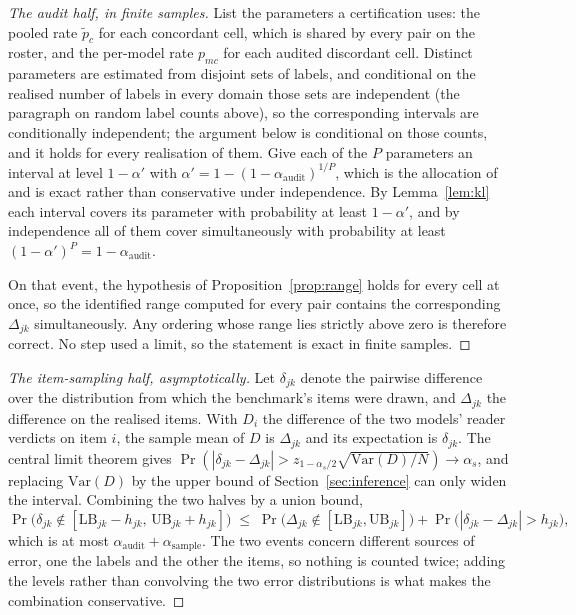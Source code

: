 \begin{proof}[The audit half, in finite samples]
List the parameters a certification uses: the pooled rate $\tilde p_c$ for each concordant
cell, which is shared by every pair on the roster, and the per-model rate $p_{mc}$ for each
audited discordant cell. Distinct parameters are estimated from disjoint sets of labels, and
conditional on the realised number of labels in every domain those sets are independent (the
paragraph on random label counts above), so the corresponding intervals are conditionally
independent; the argument below is conditional on those counts, and it holds for every
realisation of them. Give each of the $P$ parameters an interval at level
$1 - \alpha'$ with $\alpha' = 1 - (1 - \alpha_{\mathrm{audit}})^{1/P}$, which is the
allocation of \citet{sidak1967rectangular} and is exact rather than conservative under
independence. By Lemma~\ref{lem:kl} each interval covers its parameter with probability at
least $1 - \alpha'$, and by independence all of them cover simultaneously with probability at
least $(1-\alpha')^{P} = 1 - \alpha_{\mathrm{audit}}$.

On that event, the hypothesis of Proposition~\ref{prop:range} holds for every cell at once, so
the identified range computed for every pair contains the corresponding $\Delta_{jk}$
simultaneously. Any ordering whose range lies strictly above zero is therefore correct. No
step used a limit, so the statement is exact in finite samples.
\end{proof}

\begin{proof}[The item-sampling half, asymptotically]
Let $\delta_{jk}$ denote the pairwise difference over the distribution from which the
benchmark's items were drawn, and $\Delta_{jk}$ the difference on the realised items. With
$D_i$ the difference of the two models' reader verdicts on item $i$, the sample mean
of $D$ is $\Delta_{jk}$ and its expectation is $\delta_{jk}$. The central limit theorem gives
$\Pr(|\delta_{jk} - \Delta_{jk}| > z_{1-\alpha_s/2}\sqrt{\mathrm{Var}(D)/N}) \to \alpha_s$,
and replacing $\mathrm{Var}(D)$ by the upper bound of Section~\ref{sec:inference} can only
widen the interval. Combining the two halves by a union bound,
\[
\Pr\bigl(\delta_{jk} \notin [\mathrm{LB}_{jk} - h_{jk},\, \mathrm{UB}_{jk} + h_{jk}]\bigr)
\;\le\; \Pr\bigl(\Delta_{jk} \notin [\mathrm{LB}_{jk}, \mathrm{UB}_{jk}]\bigr) + \Pr\bigl(|\delta_{jk} - \Delta_{jk}| > h_{jk}\bigr) ,
\]
which is at most $\alpha_{\mathrm{audit}} + \alpha_{\mathrm{sample}}$. The two events concern
different sources of error, one the labels and the other the items, so nothing is counted
twice; adding the levels rather than convolving the two error distributions is what makes the
combination conservative.
\end{proof}

